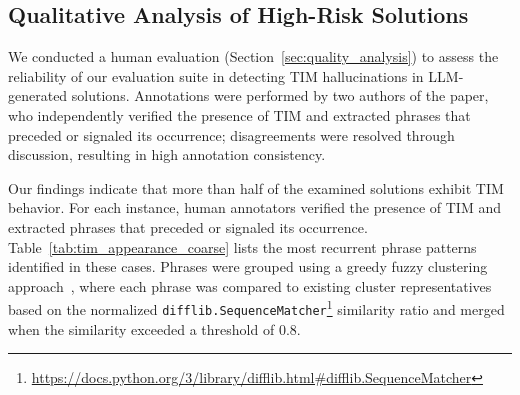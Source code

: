 \documentclass[11pt]{article}
\def \task{\textsc{TIM}\xspace}
\begin{document}
\subsection{Qualitative Analysis of High-Risk Solutions}
\label{appendix:common-precursor-phrases}
We conducted a human evaluation (Section~\ref{sec:quality_analysis}) to assess the reliability of our evaluation suite in detecting \task{} hallucinations in LLM-generated solutions. 
Annotations were performed by two authors of the paper, who independently verified the presence of \task{} and extracted phrases that preceded or signaled its occurrence; disagreements were resolved through discussion, resulting in high annotation consistency.

Our findings indicate that more than half of the examined solutions exhibit \task{} behavior. For each instance, human annotators verified the presence of \task{} and extracted phrases that preceded or signaled its occurrence. Table~\ref{tab:tim_appearance_coarse} lists the most recurrent phrase patterns identified in these cases. Phrases were grouped using a greedy fuzzy clustering approach~\citep{levenshtein1966binary}, where each phrase was compared to existing cluster representatives based on the normalized \texttt{difflib.SequenceMatcher}\footnote{\url{https://docs.python.org/3/library/difflib.html\#difflib.SequenceMatcher}} similarity ratio and merged when the similarity exceeded a threshold of $0.8$.
\end{document}
